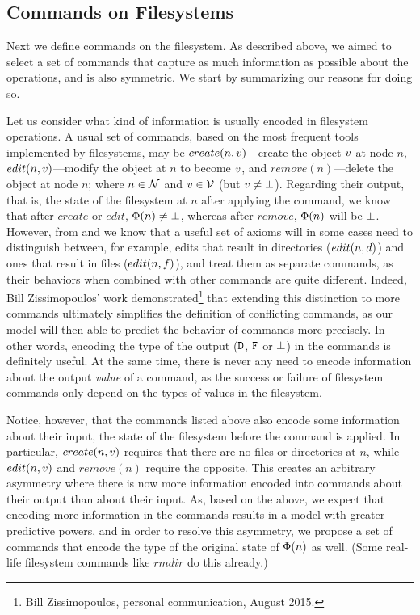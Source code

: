 
\subsection{Commands on Filesystems}

Next we define commands on the filesystem.
As described above, we aimed to select a set of commands
that capture as much information as possible
about the operations, and is also symmetric.
We start by summarizing our reasons for doing so.

Let us consider what kind of information is usually encoded in filesystem operations.
A usual set of commands, based on the most frequent tools implemented by filesystems,
may be $create(n,v)$---create the object $v$ at node $n$,
$edit(n,v)$---modify the object at $n$ to become $v$,
and $remove(n)$---delete the object at node $n$; 
where $n\in\mathcal{N}$ and $v\in\mathcal{V}$ (but $v\neq\bot$).
Regarding their output, that is, the state of the filesystem at $n$
after applying the command,
we know that after $create$ or $edit$, $\Phi(n)\neq\bot$, whereas after $remove$,
$\Phi(n)$ will be $\bot$. 
However, from \cite{NREC} and \cite{CBNR} we know that a useful set of axioms
will in some cases need to distinguish between, for example,
edits that result in directories ($edit(n,d)$) and
ones that result in files ($edit(n,f)$), and treat them as separate commands,
as their behaviors when combined with other commands are quite different.
Indeed, Bill Zissimopoulos' work 
demonstrated\footnote{Bill Zissimopoulos, personal communication, August 2015.}
that extending this distinction to more commands ultimately simplifies
the definition of conflicting commands, as our model will then able to predict the behavior of commands
more precisely.
In other words, encoding the type of the output ($\mathtt{D}$, $\mathtt{F}$ or $\bot$) in the commands is definitely useful.
At the same time, there is never any need to encode information about the
output \emph{value} of a command,
as the success or failure of filesystem commands only depend on the types of values in the filesystem.

Notice, however, that the commands listed above also encode some information about 
their input, the state of the filesystem
before the command is applied. In particular, $create(n,v)$ requires that there are no files
or directories at $n$, while $edit(n,v)$ and $remove(n)$ require the opposite.
This creates an arbitrary asymmetry where
there is now more information encoded into commands about their output than about their input.
As, based on the above, we expect that encoding more information in the commands
results in a model with greater predictive powers,
and in order to resolve this asymmetry, 
we propose a set of commands that encode
the type of the original state of $\Phi(n)$ as well.
(Some real-life filesystem commands like $rmdir$ do this already.)

